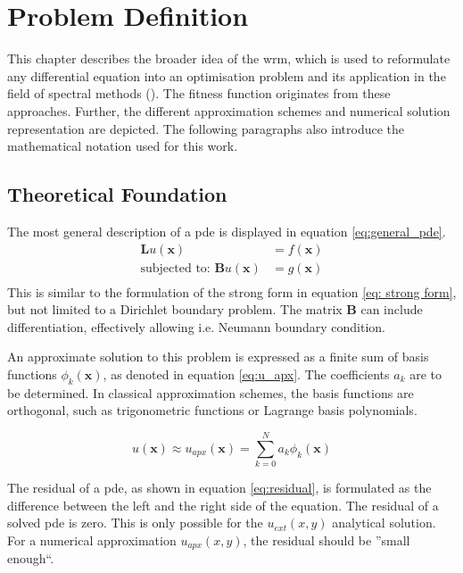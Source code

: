 \documentclass[./\jobname.tex]{subfiles}
\begin{document}
\chapter{Problem Definition}
This chapter describes the broader idea of the \gls{wrm}, which is used to reformulate any differential equation into an optimisation problem and its application in the field of spectral methods (\cite{shen_spectral_2011}). The fitness function originates from these approaches. Further, the different approximation schemes and numerical solution representation are depicted. The following paragraphs also introduce the mathematical notation used for this work. 

\section{Theoretical Foundation}
\label{chap:opt_problem}

The most general description of a \gls{pde} is displayed in equation \ref{eq:general_pde}.
\begin{equation}
\label{eq:general_pde}
\begin{split}
\mathbf{L}u(\mathbf{x}) & = f(\mathbf{x}) \\
\text{subjected to: }\mathbf{B}u(\mathbf{x}) & = g(\mathbf{x}) \\
\end{split}
\end{equation}
This is similar to the formulation of the strong form in equation \ref{eq: strong form}, but not limited to a Dirichlet boundary problem. The matrix $\mathbf{B}$ can include differentiation, effectively allowing i.e. Neumann boundary condition. 

An approximate solution to this problem is expressed as a finite sum of basis functions $\phi_k(\mathbf{x})$, as denoted in equation \ref{eq:u_apx}. The coefficients $a_k$ are to be determined. In classical approximation schemes, the basis functions are orthogonal, such as trigonometric functions or Lagrange basis polynomials. 

\begin{equation}
\label{eq:u_apx}
u(\mathbf{x}) \approx u_{apx}(\mathbf{x}) = \sum_{k=0}^{N} a_k \phi_k (\mathbf{x})
\end{equation}

The residual of a \gls{pde}, as shown in equation \ref{eq:residual}, is formulated as the difference between the left and the right side of the equation. The residual of a solved \gls{pde} is zero. This is only possible for the $u_{ext}(x,y)$ analytical solution. For a numerical approximation $u_{apx}(x,y)$, the residual should be ''small enough``. 
\end{document}
